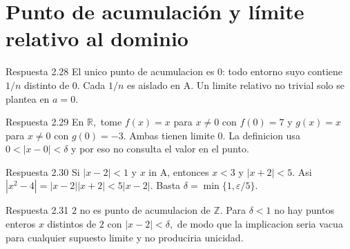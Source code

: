 \documentclass[10pt,a4paper,oneside,openany]{book}
\begin{document}
\section{Punto de acumulación y límite relativo al dominio}
\begin{PSevenAnswerFixed}{Respuesta 2.28}
El unico punto de acumulacion es \(0\): todo entorno suyo contiene \(1/n\) distinto de \(0\). Cada \(1/n\) es aislado en A. Un limite relativo no trivial solo se plantea en \(a=0\).
\end{PSevenAnswerFixed}
\begin{PSevenAnswerFixed}{Respuesta 2.29}
En \(\mathbb{R},\) tome \(f(x)=x\) para \(x\ne 0\) con \(f(0)=7\) y \(g(x)=x\) para \(x\ne 0\) con \(g(0)=-3\). Ambas tienen limite \(0\). La definicion usa \(0<|x-0|<\delta \) y por eso no consulta el valor en el punto.
\end{PSevenAnswerFixed}
\begin{PSevenAnswerFixed}{Respuesta 2.30}
Si \(|x-2|<1\) y \(x\) in A, entonces \(x<3\) y \(|x+2|<5\). Asi \(|x^{2}-4|=|x-2||x+2|<5|x-2|\). Basta \(\delta =\min\{1,\varepsilon /5\}\).
\end{PSevenAnswerFixed}
\begin{PSevenAnswerFixed}{Respuesta 2.31}
\(2\) no es punto de acumulacion de \(\mathbb{Z}\). Para \(\delta <1\) no hay puntos enteros \(x\) distintos de \(2\) con \(|x-2|<\delta ,\) de modo que la implicacion seria vacua para cualquier supuesto limite y no produciria unicidad.
\end{PSevenAnswerFixed}
\end{document}
